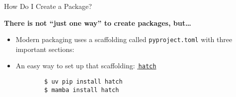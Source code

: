 \begin{frame}[fragile]{How Do I Create a Package?}
  \begin{center}
    \huge\textcolor{ccyan!90!cblack}{\textbf{There is not \enquote{just one way} to create packages, but\dots}}
  \end{center}
  \vspace{1em}
  \begin{itemize}
    \setlength{\itemsep}{1em}
    \item Modern packaging uses a scaffolding called \texttt{pyproject.toml} with three important sections:
    \item An easy way to set up that scaffolding: \href{https://hatch.pypa.io/latest/}{{\footnotesize{\faExternalLink*}}\,\texttt{hatch}}
      \begin{verbatim}
        $ uv pip install hatch
        $ mamba install hatch
      \end{verbatim}
  \end{itemize}
\end{frame}

